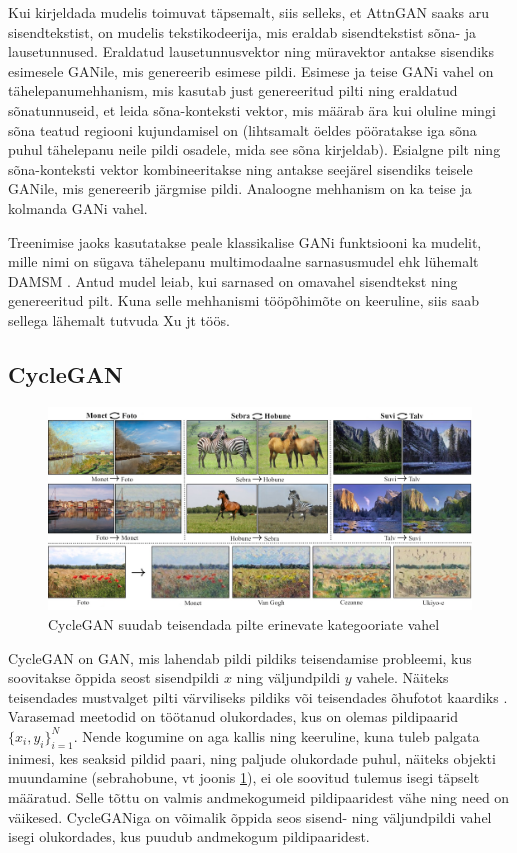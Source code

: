 \documentclass{vilgym}
\begin{document}
	Kui kirjeldada mudelis toimuvat täpsemalt, siis selleks, et AttnGAN saaks aru sisendtekstist, on mudelis tekstikodeerija, mis eraldab sisendtekstist sõna- ja lausetunnused. Eraldatud lausetunnusvektor ning müravektor antakse sisendiks esimesele GANile, mis genereerib esimese pildi. Esimese ja teise GANi vahel on tähelepanumehhanism, mis kasutab just genereeritud pilti ning eraldatud sõnatunnuseid, et leida sõna-konteksti vektor, mis määrab ära kui oluline mingi sõna teatud regiooni kujundamisel on (lihtsamalt öeldes pööratakse iga sõna puhul tähelepanu neile pildi osadele, mida see sõna kirjeldab). Esialgne pilt ning sõna-konteksti vektor kombineeritakse ning antakse seejärel sisendiks teisele GANile, mis genereerib järgmise pildi. Analoogne mehhanism on ka teise ja kolmanda GANi vahel.

	Treenimise jaoks kasutatakse peale klassikalise GANi funktsiooni ka mudelit, mille nimi on sügava tähelepanu multimodaalne sarnasusmudel ehk lühemalt DAMSM . Antud mudel leiab, kui sarnased on omavahel sisendtekst ning genereeritud pilt. Kuna selle mehhanismi tööpõhimõte on keeruline, siis saab sellega lähemalt tutvuda Xu jt töös. \parencite{attngan}

	\subsection{CycleGAN}
	\begin{figure}[t]
		\centering
			\includegraphics[width=\linewidth]{images/cyclegan_est.png}
			\caption{CycleGAN suudab teisendada pilte erinevate kategooriate vahel \parencite{cyclegan}}
			\label{fig:cyclegan}
	\end{figure}

	CycleGAN on GAN, mis lahendab pildi pildiks teisendamise probleemi, kus soovitakse õppida seost sisendpildi $ x $ ning väljundpildi $ y $ vahele. Näiteks teisendades mustvalget pilti värviliseks pildiks või teisendades õhufotot kaardiks . Varasemad meetodid on töötanud olukordades, kus on olemas pildipaarid $ \{x_i, y_i\}_{i=1}^N $. Nende kogumine on aga kallis ning keeruline, kuna tuleb palgata inimesi, kes seaksid pildid paari, ning paljude olukordade puhul, näiteks objekti muundamine (sebra\textrightarrow hobune, vt joonis \ref{fig:cyclegan}), ei ole soovitud tulemus isegi täpselt määratud. Selle tõttu on valmis andmekogumeid pildipaaridest vähe ning need on väikesed. CycleGANiga on võimalik õppida seos sisend- ning väljundpildi vahel isegi olukordades, kus puudub andmekogum pildipaaridest. 
\end{document}
